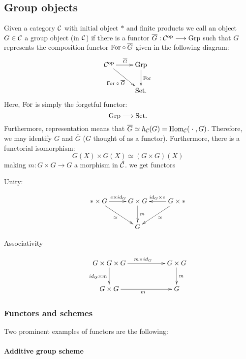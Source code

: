 \subsection{Group objects}
Given a category $\mathcal{C}$ with initial object $\ast$ and finite products we call an object $G \in \mathcal{C}$ a group object (in $\mathcal{C}$) %
if there is a functor $\overline{G} : \mathcal{C}^{\mathrm{op}} \longrightarrow \mathrm{Grp}$ such that $G$ represents the composition functor $\mathrm{For} \circ \overline{G}$ given in the following diagram:
$$\xymatrix{ \calc^{\mrm{op}} \ar[r]^{\overline{G}} \ar[rd]_{\mrm{For}\;\circ\;\overline{G}}& \mrm{Grp}\ar[d]^{\mrm{For}}\\
&\mrm{Set}.\\
}$$
Here, $\mathrm{For}$ is simply the forgetful functor:
$$\mathrm{Grp} \longrightarrow \mathrm{Set}.$$
Furthermore, representation means that $\overline{G} \simeq h_{\mathcal{C}}(G) = \mathrm{Hom}_{\mathcal{C}}(\;\cdot\;,G)$. Therefore, we may identify $G$ and $\overline{G}$ ($G$ thought of as a functor). Furthermore, there is a functorial isomorphism:
$$G(X) \times G(X) \simeq (G \times G)(X)$$
making $m : G \times G \longrightarrow G$ a morphism in $\hat{\mathcal{C}}$.
we get functors%
\begin{description}
\item[Unity:]
$$\xymatrix{
\ast \times G \ar[rd]_\simeq \ar[r]^{e \times id_G}& G\times G \ar[d]^m&G\times \ast\ar[l]_{id_G \times e}\ar[ld]^\simeq\\
&G&\\
}$$
\item[Associativity]
$$\xymatrix{
G \times G \times G \ar[rr]^{m \times id_G}\ar[d]_{id_G\times m} && G\times G \ar[d]^m\\
G \times G \ar[rr]_m &&G\\
}$$
\end{description}
\subsubsection{Functors and schemes}
Two prominent examples of functors are the following:
\paragraph{Additive group scheme}

